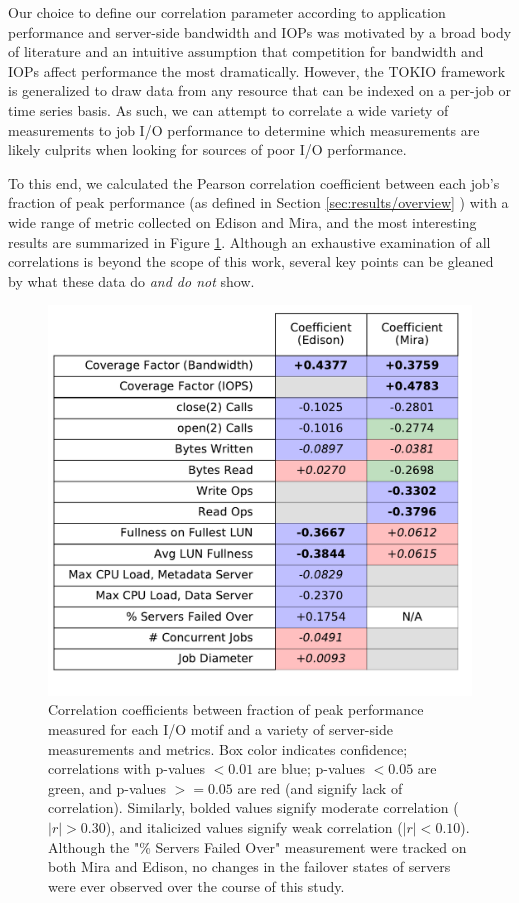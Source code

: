 \documentclass[conference,10pt,compsocconf]{IEEEtran}
\begin{document}
Our choice to define our correlation parameter according to application performance and server-side bandwidth and IOPs was motivated by a broad body of literature and an intuitive assumption that competition for bandwidth and IOPs affect performance the most dramatically.  However, the TOKIO framework is generalized to draw data from any resource that can be indexed on a per-job or time series basis. As such, we can attempt to correlate a wide variety of measurements to job I/O performance to determine which measurements are likely culprits when looking for sources of poor I/O performance.

To this end, we calculated the Pearson correlation coefficient between each job's fraction of peak performance (as defined in Section \ref{sec:results/overview} ) with a wide range of metric collected on Edison and Mira, and the most interesting results are summarized in Figure \ref{fig:correlation-table}.  Although an exhaustive examination of all correlations is beyond the scope of this work, several key points can be gleaned by what these data do \emph{and do not} show.

\begin{figure}[t]
    \centering
    \includegraphics[width=\columnwidth]{figs/correlation_table.pdf}
    \caption{Correlation coefficients between fraction of peak performance measured for each I/O motif and a variety of server-side measurements and metrics.  Box color indicates confidence; correlations with p-values $< 0.01$ are blue; p-values $< 0.05$ are green, and p-values $>= 0.05$ are red (and signify lack of correlation).  Similarly, bolded values signify moderate correlation ($|r| > 0.30$), and italicized values signify weak correlation ($|r| < 0.10$).  Although the "\% Servers Failed Over" measurement were tracked on both Mira and Edison, no changes in the
    failover states of servers were ever observed over the course of this study.
    }
    \label{fig:correlation-table}
\end{figure}
\end{document}
